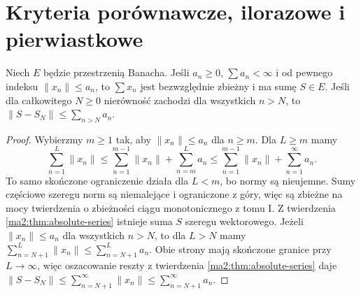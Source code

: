 \section{Kryteria porównawcze, ilorazowe i pierwiastkowe}
\begin{wniosek}
\label{ma2:cor:series-majorant}
Niech $E$ będzie przestrzenią Banacha. Jeśli $a_n\ge0$,
$\sum a_n<\infty$ i od pewnego indeksu $\|x_n\|\le a_n$,
to $\sum x_n$ jest bezwzględnie zbieżny i ma sumę $S\in E$.
Jeśli dla całkowitego $N\ge0$ nierówność zachodzi dla wszystkich
$n>N$, to $\|S-S_N\|\le\sum_{n>N}a_n$.
\end{wniosek}
\begin{proof}
Wybierzmy $m\ge1$ tak, aby $\|x_n\|\le a_n$ dla $n\ge m$.
Dla $L\ge m$ mamy
\[
 \sum_{n=1}^L\|x_n\|\le
 \sum_{n=1}^{m-1}\|x_n\|+\sum_{n=m}^L a_n
 \le \sum_{n=1}^{m-1}\|x_n\|+\sum_{n=1}^\infty a_n.
\]
To samo skończone ograniczenie działa dla $L<m$,
bo normy są nieujemne. Sumy częściowe szeregu norm są
niemalejące i ograniczone z góry, więc są zbieżne
na mocy twierdzenia o zbieżności ciągu monotonicznego
z tomu I. Z twierdzenia \ref{ma2:thm:absolute-series}
istnieje suma $S$ szeregu wektorowego.
Jeżeli $\|x_n\|\le a_n$ dla wszystkich $n>N$, to dla $L>N$
mamy $\sum_{n=N+1}^L\|x_n\|\le\sum_{n=N+1}^L a_n$.
Obie strony mają skończone granice przy $L\to\infty$,
więc oszacowanie reszty z twierdzenia
\ref{ma2:thm:absolute-series} daje
$\|S-S_N\|\le\sum_{n=N+1}^\infty\|x_n\|
\le\sum_{n=N+1}^\infty a_n$.
\end{proof}

